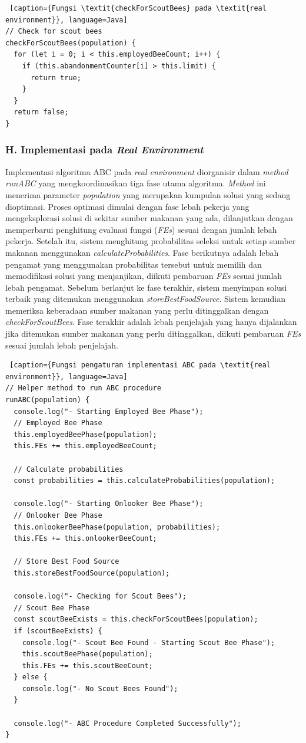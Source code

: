\begin{lstlisting} [caption={Fungsi \textit{checkForScoutBees} pada \textit{real environment}}, language=Java]
// Check for scout bees
checkForScoutBees(population) {
  for (let i = 0; i < this.employedBeeCount; i++) {
    if (this.abandonmentCounter[i] > this.limit) {
      return true;
    }
  }
  return false;
}
\end{lstlisting}

\subsubsection{H. Implementasi pada \textit{Real Environment}}
Implementasi algoritma ABC pada \textit{real environment} diorganisir dalam \textit{method runABC} yang mengkoordinasikan tiga fase utama algoritma. \textit{Method} ini menerima parameter \textit{population} yang merupakan kumpulan solusi yang sedang dioptimasi. Proses optimasi dimulai dengan fase lebah pekerja yang mengeksplorasi solusi di sekitar sumber makanan yang ada, dilanjutkan dengan memperbarui penghitung evaluasi fungsi (\textit{FEs}) sesuai dengan jumlah lebah pekerja. Setelah itu, sistem menghitung probabilitas seleksi untuk setiap sumber makanan menggunakan \textit{calculateProbabilities}. Fase berikutnya adalah lebah pengamat yang menggunakan probabilitas tersebut untuk memilih dan memodifikasi solusi yang menjanjikan, diikuti pembaruan \textit{FEs} sesuai jumlah lebah pengamat. Sebelum berlanjut ke fase terakhir, sistem menyimpan solusi terbaik yang ditemukan menggunakan \textit{storeBestFoodSource}. Sistem kemudian memeriksa keberadaan sumber makanan yang perlu ditinggalkan dengan \textit{checkForScoutBees}. Fase terakhir adalah lebah penjelajah yang hanya dijalankan jika ditemukan sumber makanan yang perlu ditinggalkan, diikuti pembaruan \textit{FEs} sesuai jumlah lebah penjelajah.

\begin{lstlisting} [caption={Fungsi pengaturan implementasi ABC pada \textit{real environment}}, language=Java]
// Helper method to run ABC procedure
runABC(population) {
  console.log("- Starting Employed Bee Phase");
  // Employed Bee Phase
  this.employedBeePhase(population);
  this.FEs += this.employedBeeCount;
  
  // Calculate probabilities
  const probabilities = this.calculateProbabilities(population);
  
  console.log("- Starting Onlooker Bee Phase");
  // Onlooker Bee Phase
  this.onlookerBeePhase(population, probabilities);
  this.FEs += this.onlookerBeeCount;
  
  // Store Best Food Source
  this.storeBestFoodSource(population);
  
  console.log("- Checking for Scout Bees");
  // Scout Bee Phase
  const scoutBeeExists = this.checkForScoutBees(population);
  if (scoutBeeExists) {
    console.log("- Scout Bee Found - Starting Scout Bee Phase");
    this.scoutBeePhase(population);
    this.FEs += this.scoutBeeCount;
  } else {
    console.log("- No Scout Bees Found");
  }
  
  console.log("- ABC Procedure Completed Successfully");
}
\end{lstlisting}

